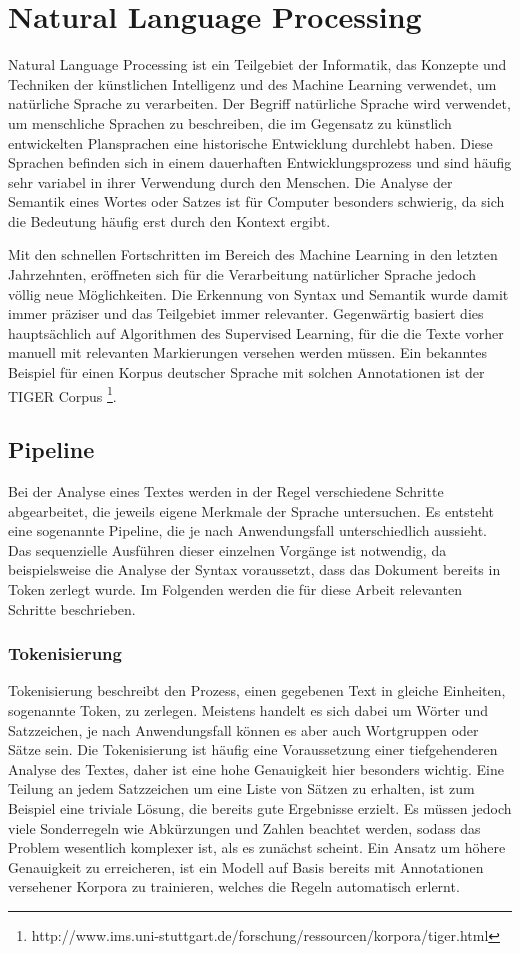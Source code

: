 \section{Natural Language Processing}
Natural Language Processing ist ein Teilgebiet der Informatik, das Konzepte und Techniken der künstlichen Intelligenz und des Machine Learning verwendet, um natürliche Sprache zu verarbeiten. Der Begriff natürliche Sprache wird verwendet, um menschliche Sprachen zu beschreiben, die im Gegensatz zu künstlich entwickelten Plansprachen eine historische Entwicklung durchlebt haben. Diese Sprachen befinden sich in einem dauerhaften Entwicklungsprozess und sind häufig sehr variabel in ihrer Verwendung durch den Menschen. Die Analyse der Semantik eines Wortes oder Satzes ist für Computer besonders schwierig, da sich die Bedeutung häufig erst durch den Kontext ergibt.

Mit den schnellen Fortschritten im Bereich des Machine Learning in den letzten Jahrzehnten, eröffneten sich für die Verarbeitung natürlicher Sprache jedoch völlig neue Möglichkeiten. Die Erkennung von Syntax und Semantik wurde damit immer präziser und das Teilgebiet immer relevanter. Gegenwärtig basiert dies hauptsächlich auf Algorithmen des Supervised Learning, für die die Texte vorher manuell mit relevanten Markierungen versehen werden müssen. Ein bekanntes Beispiel für einen Korpus deutscher Sprache mit solchen Annotationen ist der TIGER Corpus \footnote{http://www.ims.uni-stuttgart.de/forschung/ressourcen/korpora/tiger.html}.

\subsection{Pipeline}\label{pipeline}
Bei der Analyse eines Textes werden in der Regel verschiedene Schritte abgearbeitet, die jeweils eigene Merkmale der Sprache untersuchen. Es entsteht eine sogenannte Pipeline, die je nach Anwendungsfall unterschiedlich aussieht. Das sequenzielle Ausführen dieser einzelnen Vorgänge ist notwendig, da beispielsweise die Analyse der Syntax voraussetzt, dass das Dokument bereits in Token zerlegt wurde. Im Folgenden werden die für diese Arbeit relevanten Schritte beschrieben.

\subsubsection*{Tokenisierung}
Tokenisierung beschreibt den Prozess, einen gegebenen Text in gleiche Einheiten, sogenannte Token, zu zerlegen. Meistens handelt es sich dabei um Wörter und Satzzeichen, je nach Anwendungsfall können es aber auch Wortgruppen oder Sätze sein. Die Tokenisierung ist häufig eine Voraussetzung einer tiefgehenderen Analyse des Textes, daher ist eine hohe Genauigkeit hier besonders wichtig. Eine Teilung an jedem Satzzeichen um eine Liste von Sätzen zu erhalten, ist zum Beispiel eine triviale Lösung, die bereits gute Ergebnisse erzielt. Es müssen jedoch viele Sonderregeln wie Abkürzungen und Zahlen beachtet werden, sodass das Problem wesentlich komplexer ist, als es zunächst scheint. Ein Ansatz um höhere Genauigkeit zu erreicheren, ist ein Modell auf Basis bereits mit Annotationen versehener Korpora zu trainieren, welches die Regeln automatisch erlernt.

